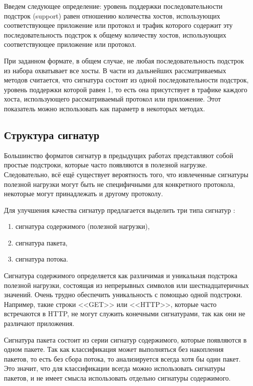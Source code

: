 Введем следующее определение: уровень поддержки последовательности подстрок (support) равен отношению количества хостов,
использующих соответствующее приложение или протокол и трафик которого содержит эту последовательность подстрок
к общему количеству хостов, использующих соответствующее приложение или протокол.

При заданном формате, в общем случае, не любая последовательность подстрок из набора охватывает все хосты.
В части из дальнейших рассматриваемых методов считается, что сигнатура состоит из одной последовательности подстрок,
уровень поддержки которой равен 1, то есть она присутствует в трафике каждого хоста, использующего рассматриваемый протокол
или приложение. Этот показатель можно использовать как параметр в некоторых методах.

\subsection{Структура сигнатур}

Большинство форматов сигнатур в предыдущих работах \cite{park2008towards,ye2009autosig,santosautomatic}
представляют собой простые подстроки, которые часто появляются в полезной нагрузке.
Следовательно, всё ещё существует вероятность того, что извлеченные сигнатуры полезной нагрузки могут быть не специфичными
для конкретного протокола, некоторые могут принадлежать и другому протоколу.

Для улучшения качества сигнатур предлагается выделить три типа сигнатур \cite{goo2016payload, shim2019automatic}:

\begin{enumerate}
    \item сигнатура содержимого (полезной нагрузки),
    \item сигнатура пакета,
    \item сигнатура потока.
\end{enumerate}

Сигнатура содержимого определяется как различимая и уникальная подстрока полезной нагрузки, состоящая из непрерывных символов или
шестнадцатеричных значений. Очень трудно обеспечить уникальность с помощью одной подстроки. Например,
такие строки <<GET>>  или <<HTTP>>, которые часто встречаются в HTTP, не могут служить конечными сигнатурами,
так как они не различают приложения.

Сигнатура пакета состоит из серии сигнатур содержимого, которые появляются в одном пакете.
Так как классификация может выполняться без накопления пакетов, то есть без сбора потока, то анализируется всегда хотя бы один пакет.
Это значит, что для классификации всегда можно использовать сигнатуры пакетов, и не имеет смысла использовать отдельно сигнатуры
содержимого.

